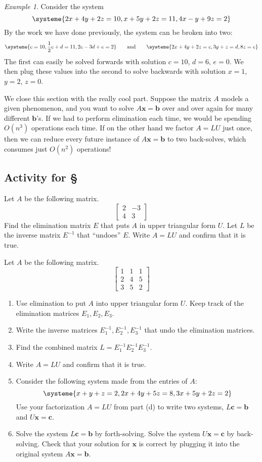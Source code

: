\documentclass[11pt,oneside]{amsbook}
\theoremstyle{definition}
\theoremstyle{plain}
\theoremstyle{definition}
\theoremstyle{remark}
\newtheorem{example}[theorem]{Example}
\numberwithin{equation}{section}
\numberwithin{figure}{section}
\newcounter{activityitem}
\newenvironment{activity}{\begin{list}{\arabic{activityitem}.}{\usecounter{activityitem}\setlength{\itemsep}{.2in}}}{\end{list}}
\begin{document}
\begin{example}
  Consider the system
  \[\systeme{2x+4y+2z=10,x+5y+2z=11,4x-y+9z=2}
  \]
  By the work we have done previously, the system can be broken into two:
  \[\systeme{c=10,\frac12c+d=11,2c-3d+e=2}
    \qquad\text{and}\qquad
    \systeme{2x+4y+2z=c,3y+z=d,8z=e}
  \]
  The first can easily be solved forwards with solution $c=10$, $d=6$, $e=0$. We then plug these values into the second to solve backwards with solution $x=1$, $y=2$, $z=0$.
\end{example}

We close this section with the really cool part. Suppose the matrix $A$ models a given phenomenon, and you want to solve $A\bm{x}=\bm{b}$ over and over again for many different $\bm{b}$'s. If we had to perform elimination each time, we would be spending $O(n^3)$ operations each time. If on the other hand we factor $A=LU$ just once, then we can reduce every future instance of $A\bm{x}=\bm{b}$ to two back-solves, which consumes just $O(n^2)$ operations!

\newpage
\subsection*{Activity for \S \thesection}

\begin{activity}
  \item Let $A$ be the following matrix.
  \[\begin{bmatrix}2&-3\\4&3\end{bmatrix}
  \]
  Find the elimination matrix $E$ that puts $A$ in upper triangular form $U$. Let $L$ be the inverse matrix $E^{-1}$ that ``undoes'' $E$. Write $A=LU$ and confirm that it is true.
  \item Let $A$ be the following matrix.
  \[\begin{bmatrix}1&1&1\\2&4&5\\3&5&2\end{bmatrix}
  \]
  \begin{enumerate}
    \item Use elimination to put $A$ into upper triangular form $U$. Keep track of the elimination matrices $E_1,E_2,E_3$.
    \item Write the inverse matrices $E_1^{-1},E_2^{-1},E_3^{-1}$ that undo the elimination matrices.
    \item Find the combined matrix $L=E_1^{-1}E_2^{-1}E_3^{-1}$.
    \item Write $A=LU$ and confirm that it is true.
    \item Consider the following system made from the entries of $A$:
    \[\systeme{x+y+z=2,2x+4y+5z=8,3x+5y+2z=2}
    \]
    Use your factorization $A=LU$ from part (d) to write two systems, $L\bm{c}=\bm{b}$ and $U\bm{x}=\bm{c}$.
    \item Solve the system $L\bm{c}=\bm{b}$ by forth-solving. Solve the system $U\bm{x}=\bm{c}$ by back-solving. Check that your solution for $\bm{x}$ is correct by plugging it into the original system $A\bm{x}=\bm{b}$.
  \end{enumerate}
\end{activity}
\end{document}
